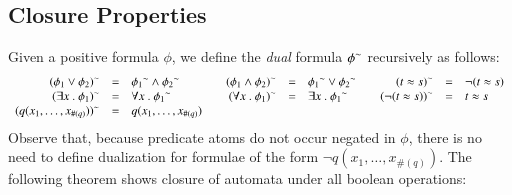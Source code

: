 \subsection{Closure Properties}
\label{sec:closure}

Given a positive formula $\phi$, we define the \emph{dual} formula
${\phi}^{\sim}$ recursively as follows:
\[\begin{array}{rclcrclcrcl}
{(\phi_1 \vee \phi_2)}^{\sim} & = & {\phi_1}^{\sim} \wedge {\phi_2}^{\sim} && 
{(\phi_1 \wedge \phi_2)}^{\sim} & = & {\phi_1}^{\sim} \vee {\phi_2}^{\sim} &&
{(t \approx s)}^{\sim} & = & \neg(t \approx s) \\
{(\exists x ~.~ \phi_1)}^{\sim} & = & \forall x ~.~ {\phi_1}^{\sim} && 
{(\forall x ~.~ \phi_1)}^{\sim} & = & \exists x ~.~ {\phi_1}^{\sim} && 
{(\neg(t \approx s))}^{\sim} & = & t \approx s \\
{(q(x_1,\ldots,x_{\#(q)}))}^{\sim} & = & q(x_1,\ldots,x_{\#(q)})
\end{array}\]
Observe that, because predicate atoms do not occur negated in $\phi$,
there is no need to define dualization for formulae of the form $\neg
q(x_1,\ldots,x_{\#(q)})$. The following theorem shows closure of
automata under all boolean operations:


